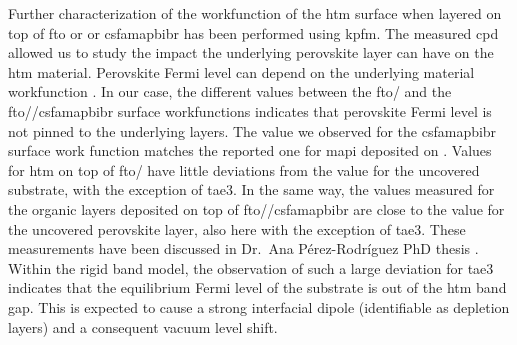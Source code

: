 	Further characterization of the workfunction of the \gls{htm} surface when layered on top of \gls{fto} or  or \gls{csfamapbibr} has been performed using \gls{kpfm}.
	The measured \gls{cpd} allowed us to study the impact the underlying perovskite layer can have on the \gls{htm} material.
	Perovskite Fermi level can depend on the underlying material workfunction \cite{Miller2014,Olthof2017}.
	In our case, the different values between the \gls{fto}\-/ and the \gls{fto}\-/\-/\gls{csfamapbibr} surface workfunctions indicates that perovskite Fermi level is not pinned to the underlying layers.
	The value we observed for the \gls{csfamapbibr} surface work function matches the reported one for \gls{mapi} deposited on  \cite{Miller2014}.
	Values for \gls{htm} on top of \gls{fto}\-/ have little deviations from the value for the uncovered substrate, with the exception of \gls{tae3}.
	In the same way, the values measured for the organic layers deposited on top of \gls{fto}\-/\-/\gls{csfamapbibr} are close to the value for the uncovered perovskite layer, also here with the exception of \gls{tae3}.
	These measurements have been discussed in Dr.\ Ana Pérez\hyp{}Rodríguez PhD thesis \cite{Perez-Rodriguez2018}.
	Within the rigid band model, the observation of such a large deviation for \gls{tae3} indicates that the equilibrium Fermi level of the substrate is out of the \gls{htm} band gap.
	This is expected to cause a strong interfacial dipole (identifiable as depletion layers) and a consequent vacuum level shift.

	
